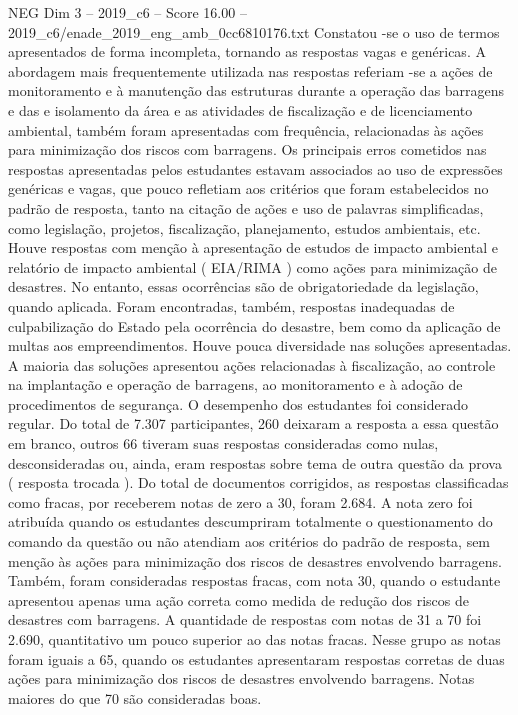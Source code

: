 \begin{textsample}{NEG Dim 3 – 2019\_c6 – Score 16.00 – 2019\_c6/enade\_2019\_eng\_amb\_0cc6810176.txt}
Constatou -se o uso de termos apresentados de forma incompleta, tornando as respostas vagas e genéricas.
A abordagem mais frequentemente utilizada nas respostas referiam -se a ações de monitoramento e à manutenção das estruturas durante a operação das barragens e das e isolamento da área e as atividades de fiscalização e de licenciamento ambiental, também foram apresentadas com frequência, relacionadas às ações para minimização dos riscos com barragens.
Os principais erros cometidos nas respostas apresentadas pelos estudantes estavam associados ao uso de expressões genéricas e vagas, que pouco refletiam aos critérios que foram estabelecidos no padrão de resposta, tanto na citação de ações e uso de palavras simplificadas, como legislação, projetos, fiscalização, planejamento, estudos ambientais, etc.
Houve respostas com menção à apresentação de estudos de impacto ambiental e relatório de impacto ambiental ( EIA/RIMA ) como ações para minimização de desastres.
No entanto, essas ocorrências são de obrigatoriedade da legislação, quando aplicada.
Foram encontradas, também, respostas inadequadas de culpabilização do Estado pela ocorrência do desastre, bem como da aplicação de multas aos empreendimentos.
Houve pouca diversidade nas soluções apresentadas.
A maioria das soluções apresentou ações relacionadas à fiscalização, ao controle na implantação e operação de barragens, ao monitoramento e à adoção de procedimentos de segurança.
O desempenho dos estudantes foi considerado regular.
Do total de 7.307 participantes, 260 deixaram a resposta a essa questão em branco, outros 66 tiveram suas respostas consideradas como nulas, desconsideradas ou, ainda, eram respostas sobre tema de outra questão da prova ( resposta trocada ).
Do total de documentos corrigidos, as respostas classificadas como fracas, por receberem notas de zero a 30, foram 2.684.
A nota zero foi atribuída quando os estudantes descumpriram totalmente o questionamento do comando da questão ou não atendiam aos critérios do padrão de resposta, sem menção às ações para minimização dos riscos de desastres envolvendo barragens.
Também, foram consideradas respostas fracas, com nota 30, quando o estudante apresentou apenas uma ação correta como medida de redução dos riscos de desastres com barragens.
A quantidade de respostas com notas de 31 a 70 foi 2.690, quantitativo um pouco superior ao das notas fracas.
Nesse grupo as notas foram iguais a 65, quando os estudantes apresentaram respostas corretas de duas ações para minimização dos riscos de desastres envolvendo barragens.
Notas maiores do que 70 são consideradas boas.

\end{textsample}

